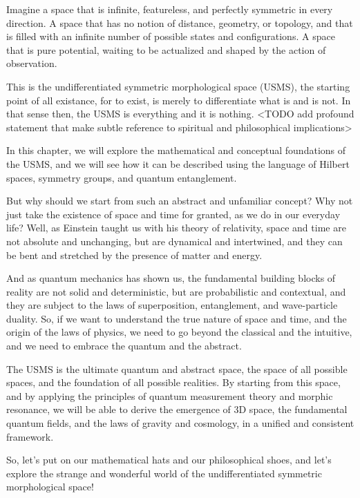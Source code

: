 Imagine a space that is infinite, featureless, and perfectly symmetric in every direction. A space that has no notion of distance, geometry, or topology, and that is filled with an infinite number of possible states and configurations. A space that is pure potential, waiting to be actualized and shaped by the action of observation.

This is the undifferentiated symmetric morphological space (USMS), the starting point of all existance, for to exist, is merely to differentiate what is and is not. In that sense then, the USMS is everything and it is nothing. <TODO add profound statement that make subtle reference to spiritual and philosophical implications>

In this chapter, we will explore the mathematical and conceptual foundations of the USMS, and we will see how it can be described using the language of Hilbert spaces, symmetry groups, and quantum entanglement.

But why should we start from such an abstract and unfamiliar concept? Why not just take the existence of space and time for granted, as we do in our everyday life? Well, as Einstein taught us with his theory of relativity, space and time are not absolute and unchanging, but are dynamical and intertwined, and they can be bent and stretched by the presence of matter and energy.

And as quantum mechanics has shown us, the fundamental building blocks of reality are not solid and deterministic, but are probabilistic and contextual, and they are subject to the laws of superposition, entanglement, and wave-particle duality. So, if we want to understand the true nature of space and time, and the origin of the laws of physics, we need to go beyond the classical and the intuitive, and we need to embrace the quantum and the abstract.

The USMS is the ultimate quantum and abstract space, the space of all possible spaces, and the foundation of all possible realities. By starting from this space, and by applying the principles of quantum measurement theory and morphic resonance, we will be able to derive the emergence of 3D space, the fundamental quantum fields, and the laws of gravity and cosmology, in a unified and consistent framework.

So, let's put on our mathematical hats and our philosophical shoes, and let's explore the strange and wonderful world of the undifferentiated symmetric morphological space!

